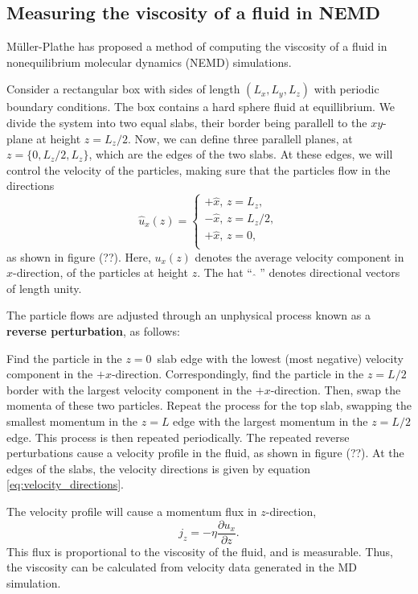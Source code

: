 \subsection{Measuring the viscosity of a fluid in NEMD}
Müller-Plathe \cite{ref:mullerplathe:reversing_the_perturbation} 
has proposed a method of computing the viscosity of a fluid in 
nonequilibrium molecular dynamics (NEMD) simulations.

Consider a rectangular box with sides of length $(L_x, L_y, L_z)$ 
with periodic boundary conditions.
The box contains a hard sphere fluid at equillibrium.
We divide the system into two equal slabs, their border 
being parallell to the $xy$-plane at height $z = L_z/2$.
Now, we can define three parallell planes, at 
$z = \{0, L_z/2, L_z\}$, which are the edges of the two slabs.
At these edges, we will control the velocity of the particles, 
making sure that the particles flow in the directions
\begin{equation}
    \label{eq:velocity_directions}
    \hat{u}_x(z) =
    \begin{cases}
        +\hat{x}, \,z = L_z,    \\
        -\hat{x}, \,z = L_z/2,  \\
        +\hat{x}, \,z = 0,    \\
    \end{cases}
\end{equation}
as shown in figure (??). %
Here, $u_x(z)$ denotes the average velocity component 
in $x$-direction, of the particles at height $z$.
The hat ``$\,\, \hat{ } \,\,$'' denotes 
directional vectors of length unity.

The particle flows are adjusted through an unphysical process known as a 
\textbf{reverse perturbation}\cite{ref:mullerplathe:reversing_the_perturbation},
as follows:

Find the particle in the $z = 0$ slab edge with the lowest 
(most negative) velocity component in the $+x$-direction.
Correspondingly, find the particle in the $z = L/2$ border 
with the largest velocity component in the $+x$-direction.
Then, swap the momenta of these two particles.
Repeat the process for the top slab, swapping the smallest momentum 
in the $z = L$ edge with the largest momentum in the $z = L/2$ edge.
This process is then repeated periodically.
The repeated reverse perturbations cause a velocity profile in the fluid,
as shown in figure (??). %
At the edges of the slabs, the velocity directions 
is given by equation \eqref{eq:velocity_directions}.

The velocity profile will cause a momentum flux in $z$-direction,
\begin{equation}
    \label{eq:momentum_flux}
    j_z = -\eta \frac{\partial u_x}{\partial z}.
\end{equation}
This flux is proportional to the viscosity of the fluid, and is measurable.
Thus, the viscosity can be calculated from velocity data generated in the 
MD simulation.

